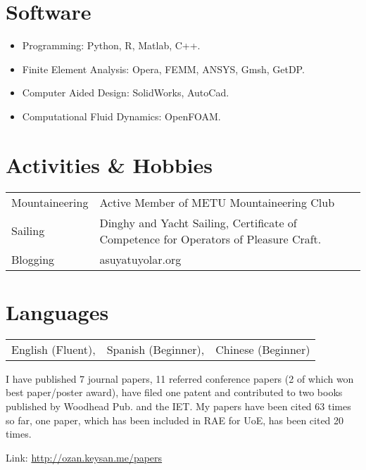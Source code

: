 \documentclass[a4paper,12pt]{article}
\begin{document}
\section{Software}
\begin{itemize}
\item Programming: Python, R, Matlab, C++.
\item Finite Element Analysis: Opera, FEMM, ANSYS, Gmsh, GetDP.
\item Computer Aided Design: SolidWorks, AutoCad.
\item Computational Fluid Dynamics: OpenFOAM.
\end{itemize}

\section{Activities \& Hobbies}
\begin{tabular}{ll}
Mountaineering & Active Member of METU Mountaineering Club\\
Sailing & Dinghy and Yacht Sailing, Certificate of Competence for Operators of Pleasure Craft. \\
Blogging & asuyatuyolar.org\\
\end{tabular}

\section{Languages}
\begin{tabular}{lll} 
English (Fluent), & Spanish (Beginner), & Chinese (Beginner)
\end{tabular}


\begin{publications}

I have published 7 journal papers, 11 referred conference papers (2 of which won best paper/poster award), have filed one patent and contributed to two books published by Woodhead Pub. and the IET. My papers have been cited 63 times so far, one paper, which has been included in RAE for UoE, has been cited 20 times.

Link: \url{http://ozan.keysan.me/papers}

\end{publications}


\end{document}
